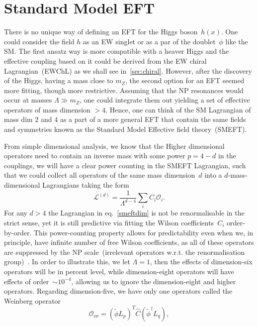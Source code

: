 \section{Standard Model EFT \label{sec:smeft}}
\par There is no unique way of defining an EFT for the Higgs boson~$h(x)$. One could consider the field $h$ as an EW singlet or as a par of the doublet~$\phi$ like the SM. The first ansatz way is more compatible with a heaver Higgs and the effective coupling based on it could be derived from the EW chiral Lagrangian~(EWChL) as we shall see in~\autoref{sec:chiral}. However, after the discovery of the Higgs, having a mass close to $m_Z$, the second option for an EFT seemed more fitting, though more restrictive. Assuming that the NP resonances would occur at masses $\Lambda \gg m_Z$, one could integrate them out yielding a set of effective operators of mass dimension $> 4$.  Hence, one can think of the SM Lagrangian of mass dim $2$ and $4$ as a part of a more general  EFT that contain the same fields and symmetries known as the Standard Model Effective field theory~(SMEFT). 
\par From simple dimensional analysis, we know that the Higher dimensional operators need to contain an inverse mass with some power $p=4-d$ in the couplings, we will have a clear power counting in the SMEFT Lagrangian, such that we could collect all operators of the same mass dimension~$d$ into a $d$-mass-dimensional Lagrangians taking the form
 \begin{equation}
 	\mathcal{L}^{(d)} = \frac{1}{\Lambda^{d-4}} \sum_i  C_i \mathcal{O}_i .
 	\label{smeftdim}
 \end{equation}
For any $d >4$ the Lagrangian in eq.~\eqref{smeftdim}  is not be renormalisable in the strict sense, yet it is still predictive via fitting the Wilson coefficients~$C_i$ order-by-order. This power-counting property allows for predictability even when we, in principle, have infinite number of free Wilson coefficients, as all of these operators are suppressed by the NP scale~(irrelevant operators w.r.t. the renormalisation group)~\cite{}. In order to illustrate this,  we let $\Lambda =1$, then the effects of dimension-six operators will be in percent level, while dimension-eight operators will have effects of order~$\sim10^{-4}$, allowing us to ignore the dimension-eight and higher operators.  Regarding dimension-five, we have only one operators called the Weinberg operator~\cite{PhysRevLett.43.1566}
 \begin{equation}
	\mathcal{O}_{\nu \nu} =(\tilde{\phi} L_p)^T \hat{C} (\tilde{\phi}^{\dagger} L_q),
	\label{weinbergoperator}
\end{equation}
